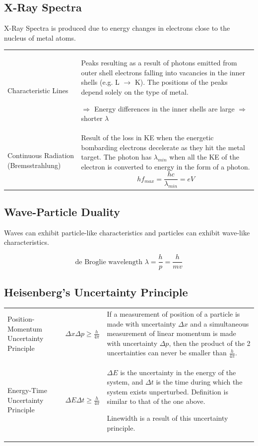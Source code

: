 \documentclass[a4paper,11pt]{article}
\begin{document}
		\subsection{X-Ray Spectra}
			X-Ray Spectra is produced due to energy changes in electrons close to the nucleus of metal atoms.
			
			\begin{center}
				\renewcommand{\arraystretch}{1.8}
				\begin{tabular}{@{} p{3.5cm} p{10.5cm} @{}}
					\toprule
					Characteristic Lines & Peaks resulting as a result of photons emitted from outer shell electrons falling into vacancies in the inner shells (e.g. L $\rightarrow$ K). The positions of the peaks depend solely on the type of metal. \par $\Rightarrow$ Energy differences in the inner shells are large $\Rightarrow$ shorter $\lambda$\\
					Continuous Radiation (Bremsstrahlung) & Result of the loss in KE when the energetic bombarding electrons decelerate as they hit the metal target. The photon has $\lambda_{min}$ when all the KE of the electron is converted to energy in the form of a photon. $$hf_{max}=\frac{hc}{\lambda_{min}}=eV$$ \vspace*{-\baselineskip}\\
					\bottomrule
				\end{tabular}
			\end{center}
		\subsection{Wave-Particle Duality}
			Waves can exhibit particle-like characteristics and particles can exhibit wave-like characteristics.
			
			$$\textrm{de Broglie wavelength }\lambda = \frac{h}{p}=\frac{h}{mv}$$
		\subsection{Heisenberg's Uncertainty Principle}
			\begin{center}
				\renewcommand{\arraystretch}{1.8}
				\begin{tabular}{@{} p{3.5cm} l p{8.3cm} @{}}
					\toprule
					Position-Momentum Uncertainty Principle & $\displaystyle \Delta x \Delta p \geq \frac{h}{4\pi}$ & If a measurement of position of a particle is made with uncertainty $\Delta x$ and a simultaneous measurement of linear momentum is made with uncertainty $\Delta p$, then the product of the 2 uncertainties can never be smaller than $\frac{h}{4\pi}$. \\
					Energy-Time Uncertainty Principle & $\displaystyle \Delta E \Delta t \geq \frac{h}{4\pi}$ & $\Delta E$ is the uncertainty in the energy of the system, and $\Delta t$ is the time during which the system exists unperturbed. Definition is similar to that of the one above. \par Linewidth is a result of this uncertainty principle. \\
					\bottomrule
				\end{tabular}
			\end{center}
\end{document}
